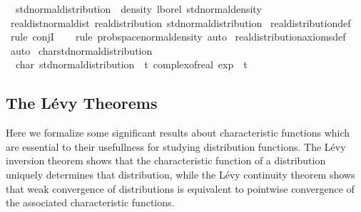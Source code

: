 \documentclass[leqno]{article}
\theoremstyle{definition}
\begin{document}
\medskip

\begin{isabellebody}
\isamarkupfalse%
\isanewline
\ \ {\isachardoublequoteopen}std{\isacharunderscore}normal{\isacharunderscore}distribution\ {\isasymequiv}\ density\ lborel\ std{\isacharunderscore}normal{\isacharunderscore}density{\isachardoublequoteclose}\isanewline
\isanewline
{}\isamarkupfalse%
\ real{\isacharunderscore}dist{\isacharunderscore}normal{\isacharunderscore}dist{\isacharcolon}\ {\isachardoublequoteopen}real{\isacharunderscore}distribution\ std{\isacharunderscore}normal{\isacharunderscore}distribution{\isachardoublequoteclose}\isanewline
{}\isamarkupfalse%
\ real{\isacharunderscore}distribution{\isacharunderscore}def\isanewline
\ \ \isamarkupfalse%
\ {\isacharparenleft}rule\ conjI{\isacharparenright}\isanewline
\ \ \isamarkupfalse%
\ {\isacharparenleft}rule\ prob{\isacharunderscore}space{\isacharunderscore}normal{\isacharunderscore}density{\isacharcomma}\ auto{\isacharparenright}\isanewline
{}\isamarkupfalse%
\ real{\isacharunderscore}distribution{\isacharunderscore}axioms{\isacharunderscore}def\ \isamarkupfalse%
\ auto
\isanewline
\isanewline
{}\isamarkupfalse%
\ char{\isacharunderscore}std{\isacharunderscore}normal{\isacharunderscore}distribution{\isacharcolon}\isanewline
\ \ {\isachardoublequoteopen}char\ std{\isacharunderscore}normal{\isacharunderscore}distribution\ {\isacharequal}\ {\isacharparenleft}{\isasymlambda}t{\isachardot}\ complex{\isacharunderscore}of{\isacharunderscore}real\ {\isacharparenleft}exp\ {\isacharparenleft}{\isacharminus}\ {\isacharparenleft}t{\isacharcircum}{}{\isacharparenright}\ {\isacharslash}\ {}{\isacharparenright}{\isacharparenright}{\isacharparenright}{\isachardoublequoteclose}
\end{isabellebody}

\subsection{The L\'evy Theorems}

Here we formalize some significant results about characteristic functions which are essential to their usefullness for studying distribution functions. The L\'evy inversion theorem shows that the characteristic function of a distribution uniquely determines that distribution, while the L\'evy continuity theorem shows that weak convergence of distributions is equivalent to pointwise convergence of the associated characteristic functions.
\end{document}
